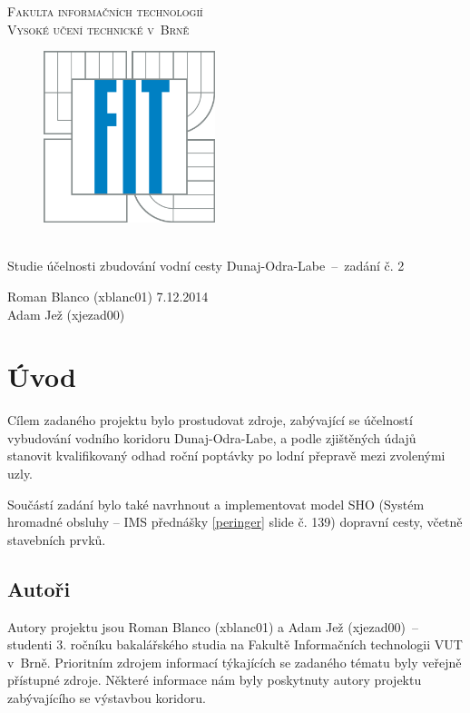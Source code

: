 \documentclass[11pt,a4paper]{article}
\begin{document}
  \begin{titlepage}
    \begin{center}
      \Huge
      \textsc{Fakulta informačních technologií\\ Vysoké učení technické v~Brně}
      \vspace{100px}
      \begin{figure}[!h]
        \centering
        \includegraphics[height=5cm]{logo.jpg}
      \end{figure}
      \\[50mm]
      \LARGE{Studie účelnosti zbudování vodní cesty Dunaj-Odra-Labe \,--\, 
             zadání č. 2}
      \vfill
    \end{center}
    \Large{Roman Blanco (xblanc01) \hfill 7.12.2014 \\
           Adam Jež (xjezad00)}
  \end{titlepage}

  \tableofcontents
  \newpage

  \section{Úvod}

    Cílem zadaného projektu bylo prostudovat zdroje, zabývající se účelností
    vybudování vodního koridoru Dunaj-Odra-Labe, a podle zjištěných údajů
    stanovit kvalifikovaný odhad roční poptávky po lodní přepravě mezi
    zvolenými uzly. 

    Součástí zadání bylo také navrhnout a implementovat model SHO
    (Systém hromadné obsluhy -- IMS přednášky \ref{peringer} slide č. 139)
    dopravní cesty, včetně
    stavebních prvků.

    \subsection{Autoři}

      Autory projektu jsou Roman Blanco (xblanc01) a Adam Jež (xjezad00) \,--\,
      studenti 3. ročníku bakalářského studia na Fakultě Informačních
      technologii VUT v~Brně. Prioritním zdrojem informací týkajících se
      zadaného tématu byly veřejně přístupné zdroje. Některé informace nám
      byly poskytnuty autory projektu zabývajícího se výstavbou koridoru.
\end{document}
